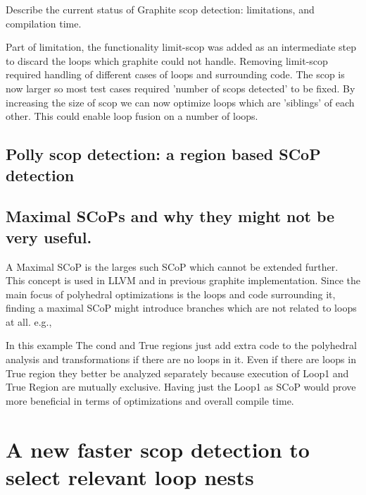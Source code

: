 \documentclass{sigplanconf}
\begin{document}
Describe the current status of Graphite scop detection: limitations, and compilation time.

Part of limitation, the functionality limit-scop was added as an intermediate
step to discard the loops which graphite could not handle. Removing limit-scop
required handling of different cases of loops and surrounding code.  The scop is
now larger so most test cases required 'number of scops detected' to be
fixed. By increasing the size of scop we can now optimize loops which are
'siblings' of each other. This could enable loop fusion on a number of loops.

\subsection{Polly scop detection: a region based SCoP detection}

\subsection{Maximal SCoPs and why they might not be very useful.}
A Maximal SCoP is the larges such SCoP which cannot be extended further. This concept is used
in LLVM 
and in previous graphite implementation.
Since the main focus of
polyhedral optimizations is the loops and code surrounding it, finding a maximal SCoP might introduce branches
which are not related to loops at all. e.g.,

\begin{comment}
Scop
Cond
|
|--True Region
|
|--False Region
|       | Loop1
|       |
\end{comment}

In this example The cond and True regions just add extra code to the polyhedral analysis and transformations if there
are no loops in it. Even if there are loops in True region they better be analyzed separately because
execution of Loop1 and True Region are mutually exclusive.
Having just the Loop1 as SCoP would prove more beneficial in terms of optimizations and overall compile time.

\section{A new faster scop detection to select relevant loop nests}
\end{document}

